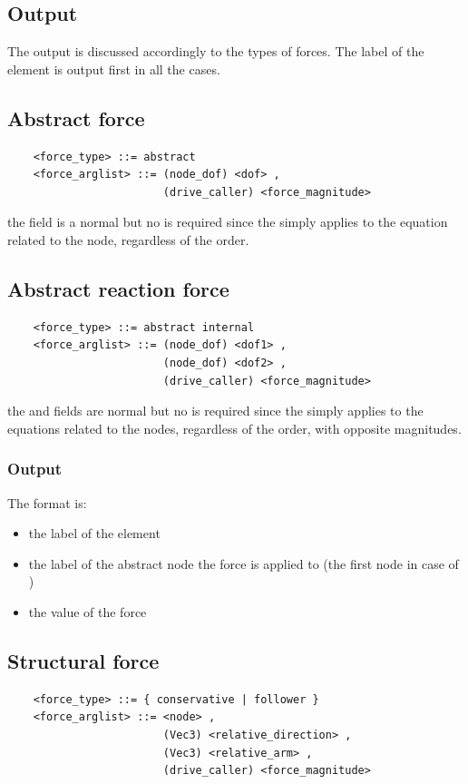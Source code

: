 \subsection{Output}
The output is discussed accordingly to the types of forces. 
The label of the element is output first in all the cases.

\subsection{Abstract force}
\begin{verbatim}
    <force_type> ::= abstract 
    <force_arglist> ::= (node_dof) <dof> ,
                        (drive_caller) <force_magnitude>
\end{verbatim}
the  field is a normal  but no  is required
since the  simply applies to the equation related to the node,
regardless of the order.

\subsection{Abstract reaction force}
\begin{verbatim}
    <force_type> ::= abstract internal
    <force_arglist> ::= (node_dof) <dof1> ,
                        (node_dof) <dof2> ,
                        (drive_caller) <force_magnitude>
\end{verbatim}
the  and  fields are normal 
but no  is required since the  simply applies
to the equations related to the nodes, regardless of the order, with
opposite magnitudes.

\subsubsection{Output}
The format is:
\begin{itemize}
    \item the label of the element
    \item the label of the abstract node the force is applied to
	(the first node in case of )
    \item the value of the force
\end{itemize}


\subsection{Structural force}
\begin{verbatim}
    <force_type> ::= { conservative | follower } 
    <force_arglist> ::= <node> , 
                        (Vec3) <relative_direction> ,
                        (Vec3) <relative_arm> ,
                        (drive_caller) <force_magnitude>
\end{verbatim}

